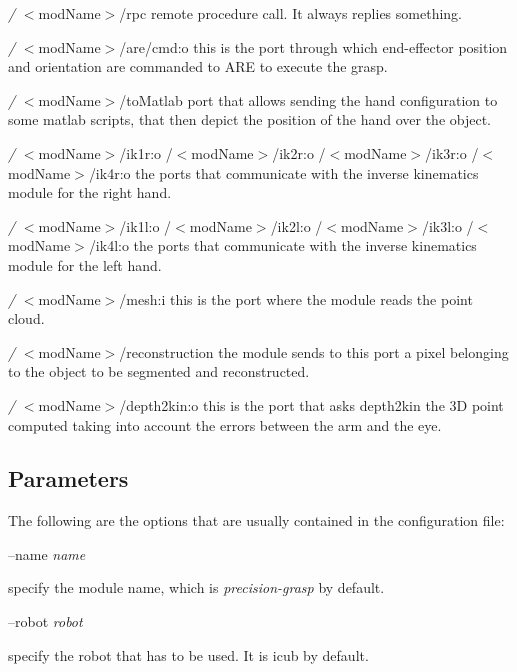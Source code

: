 \begin{DoxyItemize}
\item {\itshape /} $<$mod\+Name$>$/rpc remote procedure call. It always replies something.
\item {\itshape /} $<$mod\+Name$>$/are/cmd\+:o this is the port through which end-\/effector position and orientation are commanded to A\+RE to execute the grasp.
\item {\itshape /} $<$mod\+Name$>$/to\+Matlab port that allows sending the hand configuration to some matlab scripts, that then depict the position of the hand over the object.
\item {\itshape /} $<$mod\+Name$>$/ik1r\+:o /$<$mod\+Name$>$/ik2r\+:o /$<$mod\+Name$>$/ik3r\+:o /$<$mod\+Name$>$/ik4r\+:o the ports that communicate with the inverse kinematics module for the right hand.
\item {\itshape /} $<$mod\+Name$>$/ik1l\+:o /$<$mod\+Name$>$/ik2l\+:o /$<$mod\+Name$>$/ik3l\+:o /$<$mod\+Name$>$/ik4l\+:o the ports that communicate with the inverse kinematics module for the left hand.
\item {\itshape /} $<$mod\+Name$>$/mesh\+:i this is the port where the module reads the point cloud.
\item {\itshape /} $<$mod\+Name$>$/reconstruction the module sends to this port a pixel belonging to the object to be segmented and reconstructed.
\item {\itshape /} $<$mod\+Name$>$/depth2kin\+:o this is the port that asks depth2kin the 3D point computed taking into account the errors between the arm and the eye.
\end{DoxyItemize}\hypertarget{group__handIKModule_parameters_sec}{}\subsection{Parameters}\label{group__handIKModule_parameters_sec}
The following are the options that are usually contained in the configuration file\+:

--name {\itshape name} 
\begin{DoxyItemize}
\item specify the module name, which is {\itshape precision-\/grasp} by default.
\end{DoxyItemize}

--robot {\itshape robot} 
\begin{DoxyItemize}
\item specify the robot that has to be used. It is icub by default.
\end{DoxyItemize}

